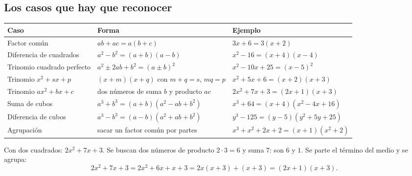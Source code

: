 \documentclass[11pt,a4paper]{article}
\begin{document}
\subsection{Los casos que hay que reconocer}
\begin{center}
\begin{tabularx}{\linewidth}{@{}l L l@{}}
\toprule
Caso & Forma & Ejemplo\\ \midrule
Factor común & $ab+ac=a(b+c)$ & $3x+6=3(x+2)$\\
Diferencia de cuadrados & $a^2-b^2=(a+b)(a-b)$ & $x^2-16=(x+4)(x-4)$\\
Trinomio cuadrado perfecto & $a^2\pm2ab+b^2=(a\pm b)^2$ & $x^2-10x+25=(x-5)^2$\\
Trinomio $x^2+sx+p$ & $(x+m)(x+q)$ con $m+q=s$, $mq=p$ & $x^2+5x+6=(x+2)(x+3)$\\
Trinomio $ax^2+bx+c$ & dos números de suma $b$ y producto $ac$ & $2x^2+7x+3=(2x+1)(x+3)$\\
Suma de cubos & $a^3+b^3=(a+b)(a^2-ab+b^2)$ & $x^3+64=(x+4)(x^2-4x+16)$\\
Diferencia de cubos & $a^3-b^3=(a-b)(a^2+ab+b^2)$ & $y^3-125=(y-5)(y^2+5y+25)$\\
Agrupación & sacar un factor común por partes & $x^3+x^2+2x+2=(x+1)(x^2+2)$\\
\bottomrule
\end{tabularx}
\end{center}

\begin{ejemplo}
Con dos cuadrados: $2x^2+7x+3$. Se buscan dos números de producto $2\cdot3=6$ y suma $7$: son $6$ y $1$. Se parte el
término del medio y se agrupa:
\[ 2x^2+7x+3=2x^2+6x+x+3=2x(x+3)+(x+3)=(2x+1)(x+3). \]
\end{ejemplo}
\end{document}
